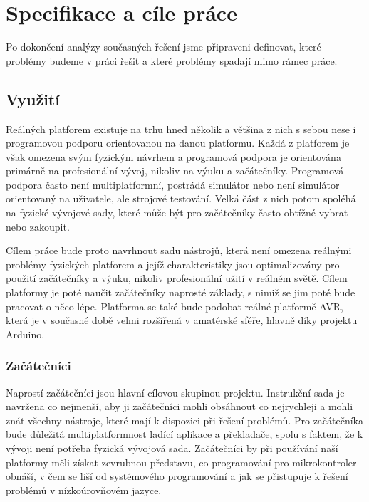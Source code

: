 \chapter{Specifikace a cíle práce}

Po dokončení analýzy současných řešení jsme připraveni definovat, které problémy budeme v práci řešit a které problémy spadají mimo rámec práce.

\section{Využití}

Reálných platforem existuje na trhu hned několik a většina z nich s sebou nese i programovou podporu orientovanou na danou platformu. Každá z platforem je však omezena svým fyzickým návrhem a programová podpora je orientována primárně na profesionální vývoj, nikoliv na výuku a začátečníky. Programová podpora často není multiplatformní, postrádá simulátor nebo není simulátor orientovaný na uživatele, ale strojové testování. Velká část z nich potom spoléhá na fyzické vývojové sady, které může být pro začátečníky často obtížné vybrat nebo zakoupit.

Cílem práce bude proto navrhnout sadu nástrojů, která není omezena reálnými problémy fyzických platforem a jejíž charakteristiky jsou optimalizovány pro použití začátečníky a výuku, nikoliv profesionální užití v reálném světě. Cílem platformy je poté naučit začátečníky naprosté základy, s nimiž se jim poté bude pracovat o něco lépe. Platforma se také bude podobat reálné platformě AVR, která je v současné době velmi rozšířená v amatérské sféře, hlavně díky projektu Arduino\todocite.

\subsection{Začátečníci}

Naprostí začátečníci jsou hlavní cílovou skupinou projektu. Instrukční sada je navržena co nejmenší, aby ji začátečníci mohli obsáhnout co nejrychleji a mohli znát všechny nástroje, které mají k dispozici při řešení problémů. Pro začátečníka bude důležitá multiplatformnost ladící aplikace a překladače, spolu s faktem, že k vývoji není potřeba fyzická vývojová sada. Začátečníci by při používání naší platformy měli získat zevrubnou představu, co programování pro mikrokontroler obnáší, v čem se liší od systémového programování a jak se přistupuje k řešení problémů v nízkoúrovňovém jazyce.

